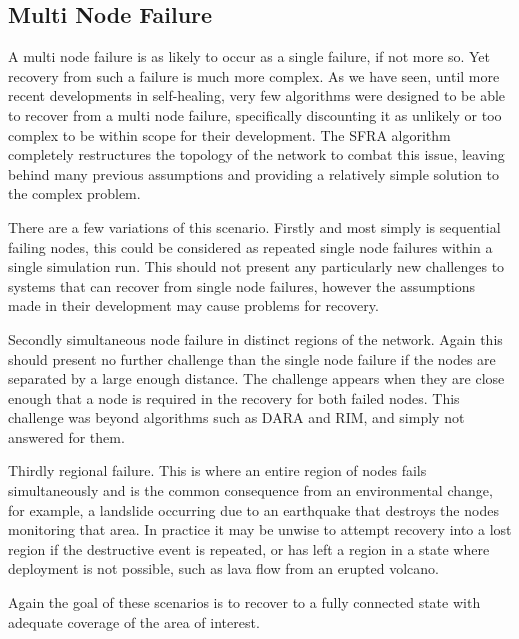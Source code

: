 \documentclass[authoryearcitations]{UoYCSproject}
\begin{document}
\subsection{Multi Node Failure}
\label{subsec:multiFailScenario}
A multi node failure is as likely to occur as a single failure, if not more so. Yet recovery from such a failure is much more complex. As we have seen, until more recent developments in self-healing, very few algorithms were designed to be able to recover from a multi node failure, specifically discounting it as unlikely or too complex to be within scope for their development. The SFRA algorithm completely restructures the topology of the network to combat this issue, leaving behind many previous assumptions and providing a relatively simple solution to the complex problem.

There are a few variations of this scenario. Firstly and most simply is sequential failing nodes, this could be considered as repeated single node failures within a single simulation run. This should not present any particularly new challenges to systems that can recover from single node failures, however the assumptions made in their development may cause problems for recovery.

Secondly simultaneous node failure in distinct regions of the network. Again this should present no further challenge than the single node failure if the nodes are separated by a large enough distance. The challenge appears when they are close enough that a node is required in the recovery for both failed nodes. This challenge was beyond algorithms such as DARA and RIM, and simply not answered for them.

Thirdly regional failure. This is where an entire region of nodes fails simultaneously and is the common consequence from an environmental change, for example, a landslide occurring due to an earthquake that destroys the nodes monitoring that area. In practice it may be unwise to attempt recovery into a lost region if the destructive event is repeated, or has left a region in a state where deployment is not possible, such as lava flow from an erupted volcano.

Again the goal of these scenarios is to recover to a fully connected state with adequate coverage of the area of interest.
\end{document}
